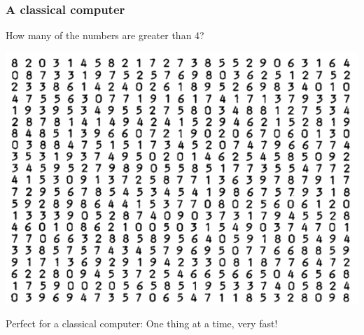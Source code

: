 \documentclass[10pt]{beamer}
\begin{document}
\begin{frame}
  \frametitle{A classical computer}
  \Large How many of the numbers are greater than 4?

  \centering 
  \includegraphics[scale=0.4]{img/random_numbers.png}

   \normalsize Perfect for a classical computer: One thing at a time, very fast!
  
\end{frame}
\end{document}
